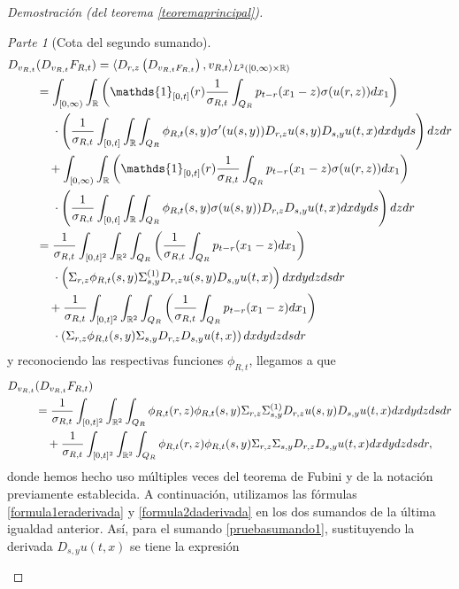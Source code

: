 \documentclass[letterpaper,twoside,12pt]{book}
\newcommand{\R}{\mathbb{R}}
\newcommand{\1}{\mathds{1}}
\theoremstyle{definition}
\theoremstyle{definition}
\theoremstyle{remark}
\newtheorem{proofpart}{Parte}
\theoremstyle{definition}
\theoremstyle{definition}
\theoremstyle{definition}
\theoremstyle{definition}
\theoremstyle{definition}
\begin{document}
\begin{proof}[Demostración (del teorema \ref{teoremaprincipal})]
\begin{proofpart}[Cota del segundo sumando]
\begin{align}
   D_{v_{R,t}}&(D_{v_{R,t}}F_{R,t})=\langle D_{r,z}\left(D_{v_{R,t}F_{R,t}}\right),v_{R,t}\rangle_{L^{2}([0,\infty)\times\R)}\notag\\
   &=\int_{[0,\infty)}\int_\R \left(\1_{[0,t]}(r)\frac{1}{\sigma_{R,t}}\int_{Q_R}p_{t-r}(x_1-z)\sigma(u(r,z))dx_1\right)\notag\\
   &\ \ \ \ \cdot \left(\frac{1}{\sigma_{R,t}}\int_{[0,t]}\int_\R \int_{Q_R}\phi_{R,t}(s,y)\sigma'(u(s,y))D_{r,z}u(s,y)D_{s,y}u(t,x)dx dy ds\right)dz dr\notag\\
   &\ \ \ +\int_{[0,\infty)}\int_\R \left(\1_{[0,t]}(r)\frac{1}{\sigma_{R,t}}\int_{Q_R}p_{t-r}(x_1-z)\sigma(u(r,z))dx_1\right)\notag\\
   &\ \ \ \ \cdot\left(\frac{1}{\sigma_{R,t}}\int_{[0,t]}\int_\R \int_{Q_R}\phi_{R,t}(s,y)\sigma(u(s,y))D_{r,z}D_{s,y}u(t,x)dx dy ds\right)dz dr\notag\\
   &=\frac{1}{\sigma_{R,t}}\int_{[0,t]^2}\int_{\R^2}\int_{Q_R}\left(\frac{1}{\sigma_{R,t}}\int_{Q_R}p_{t-r}(x_1-z)dx_1\right)\notag\\
   &\ \ \ \ \cdot \left(\Sigma_{r,z}\phi_{R,t}(s,y)\Sigma^{(1)}_{s,y}D_{r,z}u(s,y)D_{s,y}u(t,x)\right) dx dy dz ds dr\notag\\
   &\ \ \ +\frac{1}{\sigma_{R,t}}\int_{[0,t]^2}\int_{\R^2}\int_{Q_R} \left(\frac{1}{\sigma_{R,t}}\int_{Q_R}p_{t-r}(x_1-z)dx_1\right)\notag\\
   &\ \ \ \ \cdot\left(\Sigma_{r,z}\phi_{R,t}(s,y)\Sigma_{s,y}D_{r,z}D_{s,y}u(t,x)\right)dx dy dz ds dr\notag
   \end{align}
   y reconociendo las respectivas funciones $\phi_{R,t}$, llegamos a que 
   \begin{align}
      D_{v_{R,t}}&(D_{v_{R,t}}F_{R,t})\notag\\
      &=\frac{1}{\sigma_{R,t}}\int_{[0,t]^2}\int_{\R^2}\int_{Q_R}\phi_{R,t}(r,z)\phi_{R,t}(s,y)\Sigma_{r,z}\Sigma^{(1)}_{s,y}D_{r,z}u(s,y)D_{s,y}u(t,x)dx dy dz ds dr\label{pruebasumando1}\\ 
   &\ \ \ +\frac{1}{\sigma_{R,t}}\int_{[0,t]^2}\int_{\R^2}\int_{Q_R}\phi_{R,t}(r,z)\phi_{R,t}(s,y)\Sigma_{r,z}\Sigma_{s,y}D_{r,z}D_{s,y}u(t,x)dx dy dz ds dr,\label{pruebasumando2}
\end{align}
   donde hemos hecho uso múltiples veces del teorema de Fubini y de la notación previamente establecida. A continuación, utilizamos las fórmulas \eqref{formula1eraderivada} y \eqref{formula2daderivada} en los dos sumandos de la última igualdad anterior. Así, para el sumando \eqref{pruebasumando1}, sustituyendo la derivada $D_{s,y}u(t,x)$ se tiene la expresión

\end{proofpart}
\end{proof}
\end{document}
